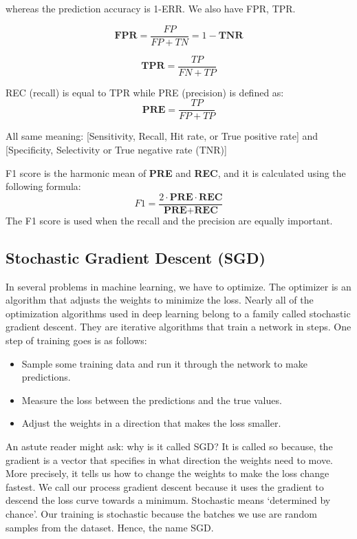 \documentclass[11pt]{article}
\begin{document}
whereas the prediction accuracy is 1-ERR. We also have FPR, TPR. 

\begin{equation}
\textbf{FPR} = \frac{FP}{FP+TN}  = 1 - \textbf{TNR} 
\end{equation}

\begin{equation}
\textbf{TPR} = \frac{TP}{FN+TP} 
\end{equation}

REC (recall) is equal to TPR while PRE (precision) is defined as:
\begin{equation}
\textbf{PRE} = \frac{TP}{FP+TP} 
\end{equation}

All same meaning: [Sensitivity, Recall, Hit rate, or True positive rate] and [Specificity, Selectivity or True negative rate (TNR)]


F1 score is the harmonic mean of \textbf{PRE} and \textbf{REC}, and it is calculated 
using the following formula: 
\[ F1 = \frac{2 \cdot \textbf{PRE} \cdot \textbf{REC}}{\textbf{PRE} + \textbf{REC}}\] 
The F1 score is used when the recall and the precision are equally important.




\subsection{Stochastic Gradient Descent (SGD)} 


In several problems in machine learning, we have to optimize. The optimizer is an algorithm that adjusts the weights to minimize the loss. Nearly 
all of the optimization algorithms used in deep learning belong to a family called stochastic gradient descent. 
They are iterative algorithms that train a network in steps. One step of training goes is as follows:

\begin{itemize}
\item Sample some training data and run it through the network to make predictions.
\item Measure the loss between the predictions and the true values.
\item Adjust the weights in a direction that makes the loss smaller.
\end{itemize} 


An astute reader might ask: why is it called SGD? 
It is called so because, the gradient is a vector that specifies in what direction the weights need to move. 
More precisely, it tells us how to change the weights to make the loss change fastest. We call our process 
gradient descent because it uses the gradient to descend the loss curve towards a minimum. Stochastic means 
`determined by chance'. Our training is stochastic because the batches we use 
are random samples from the dataset. Hence, the name SGD. 
\end{document}

